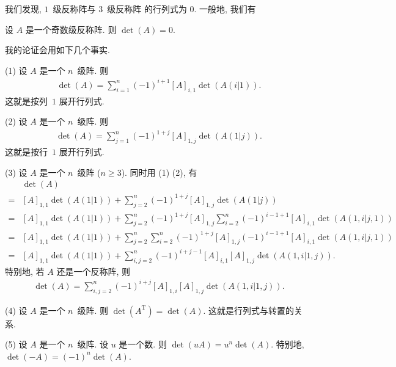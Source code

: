 我们发现, \(1\)~级反称阵与 \(3\)~级反称阵%
的行列式为 \(0\).
一般地, 我们有

\begin{theorem}
    设 \(A\) 是一个奇数级反称阵.
    则 \(\det {(A)} = 0\).
\end{theorem}

我的论证会用如下几个事实.

(1)
设 \(A\) 是一个 \(n\)~级阵.
则
\begin{align*}
    \det {(A)}
    = \sum_{i = 1}^{n}
    {(-1)^{i+1} [A]_{i,1} \det {(A(i|1))}}.
\end{align*}
这就是按列~\(1\) 展开行列式.

(2)
设 \(A\) 是一个 \(n\)~级阵.
则
\begin{align*}
    \det {(A)}
    = \sum_{j = 1}^{n}
    {(-1)^{1+j} [A]_{1,j} \det {(A(1|j))}}.
\end{align*}
这就是按行~\(1\) 展开行列式.

(3)
设 \(A\) 是一个 \(n\)~级阵 (\(n \geq 3\)).
同时用 (1) (2),
有
\begin{align*}
         & \det {(A)}
    \\
    = {} &
    [A]_{1,1} \det {(A(1|1))}
    +
    \sum_{j = 2}^{n} {
    (-1)^{1+j} [A]_{1,j} \det {(A(1|j))}
    }
    \\
    = {} &
    [A]_{1,1} \det {(A(1|1))}
    +
    \sum_{j = 2}^{n} {
    (-1)^{1+j} [A]_{1,j}
    \sum_{i = 2}^{n} {
    (-1)^{i-1+1} [A]_{i,1} \det {(A(1,i|j,1))}
    }
    }
    \\
    = {} &
    [A]_{1,1} \det {(A(1|1))}
    +
    \sum_{j = 2}^{n} {
    \sum_{i = 2}^{n} {
    (-1)^{1+j} [A]_{1,j}
    (-1)^{i-1+1} [A]_{i,1} \det {(A(1,i|j,1))}
    }
    }
    \\
    = {} &
    [A]_{1,1} \det {(A(1|1))}
    +
    \sum_{i, j = 2}^{n} {
    (-1)^{i+j-1}
        [A]_{i,1} [A]_{1,j} \det {(A(1,i|1,j))}
    }.
\end{align*}
特别地, 若 \(A\) 还是一个反称阵, 则
\begin{align*}
    \det {(A)}
    = \sum_{i, j = 2}^{n} {
    (-1)^{i+j}
        [A]_{1,i} [A]_{1,j} \det {(A(1,i|1,j))}
    }.
\end{align*}

(4)
设 \(A\) 是一个 \(n\)~级阵.
则 \(\det {(A^{\mathrm{T}})} = \det {(A)}\).
这就是行列式与转置的关系.

(5)
设 \(A\) 是一个 \(n\)~级阵.
设 \(u\) 是一个数.
则 \(\det {(uA)} = u^n \det {(A)}\).
特别地,
\(\det {(-A)} = (-1)^n \det {(A)}\).

